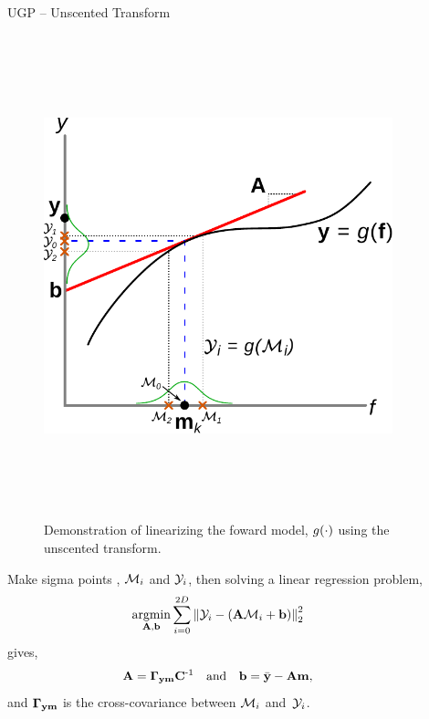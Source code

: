 \documentclass[final]{beamer}
\newlength{\sepwid}
\newlength{\onecolwid}
\newlength{\twocolwid}
\begin{document}
\begin{frame}[t]
\begin{columns}[t]
\begin{column}{\twocolwid}
\end{column} %

\begin{column}{\sepwid}\end{column} %

\begin{column}{\onecolwid} %


\begin{block}{UGP -- Unscented Transform}

\begin{figure}
    \includegraphics[height=14cm]{fig/statlin}
    \caption{Demonstration of linearizing the foward model, $\nonlin{\cdot}$
        using the unscented transform.}
\end{figure}        

Make sigma points \cite{Julier2004, Geist2010}, $\Sfunc_i$ and $\Sobs_i$, then
solving a linear regression problem,
\begin{equation*}
    \argmin_{\Linmat, \intcpt} \sum^{2D}_{i=0} 
        \lnorm{2}{\Sobs_i - \brac{\Linmat\Sfunc_i + \intcpt}}^2
\end{equation*}
gives,
\begin{equation}
    \Linmat = \xcov \pocov\inv \quad \text{and} \quad
    \intcpt = \bar\obs - \Linmat\pomean,
\end{equation}
and $\xcov$ is the cross-covariance between $\Sfunc_i$ and~$\Sobs_i$.


\end{block}
\end{column}
\end{columns}
\end{frame}
\end{document}
